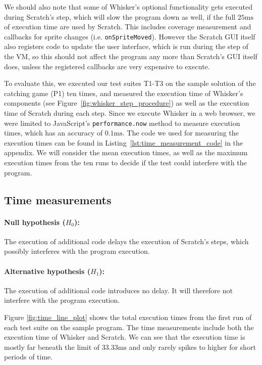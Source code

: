 We should also note that some of Whisker's optional functionality gets executed during Scratch's step,
which will slow the program down as well, if the full $25\text{ms}$ of execution time are used by Scratch.
This includes coverage measurement and callbacks for sprite changes (i.e. \texttt{onSpriteMoved}).
However the Scratch GUI itself also registers code to update the user interface, which is run during the step of the VM,
so this should not affect the program any more than Scratch's GUI itself does,
unless the registered callbacks are very expensive to execute.
\parspace

To evaluate this,
we executed our test suites T1-T3 on the sample solution of the catching game (P1) ten times,
and measured the execution time of Whisker's components (see Figure~\ref{fig:whisker_step_procedure})
as well as the execution time of Scratch during each step.
Since we execute Whisker in a web browser,
we were limited to JavaScript's \texttt{performance.now} method to measure execution times,
which has an accuracy of $0.1\text{ms}$.
The code we used for measuring the execution times can be found in Listing~\ref{lst:time_measurement_code} in the appendix.
We will consider the mean execution times, as well as the maximum execution times from the ten runs
to decide if the test could interfere with the program.

\subsection{Time measurements}

\paragraph{Null hypothesis ($H_0$):}
The execution of additional code delays the execution of Scratch's steps, which possibly interferes with the program execution.
\vspace{-\medskipamount}
\paragraph{Alternative hypothesis ($H_1$):}
The execution of additional code introduces no delay. It will therefore not interfere with the program execution.
\parspace

\noindent Figure \ref{fig:time_line_plot} shows the total execution times
from the first run of each test suite on the sample program.
The time measurements include both the execution time of Whisker and Scratch.
We can see that the execution time is mostly far beneath the limit of $33.33\text{ms}$
and only rarely spikes to higher for short periods of time.
\parspace

